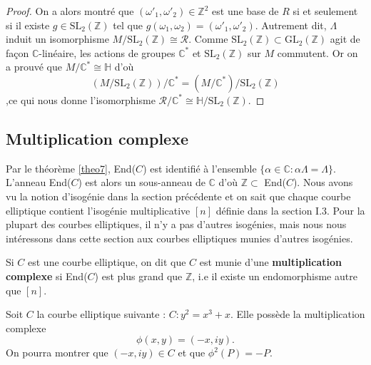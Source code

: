 \documentclass[a4paper]{article}
\begin{document}
\begin{proof}
On a alors montré que $(\omega'_{1},\omega'_{2}) \in \mathbb{Z}^2$ est une base de $R$ si et seulement si il existe $g \in \text{SL}_{2}(\mathbb{Z})$ tel que $g(\omega_{1},\omega_{2})=(\omega'_{1},\omega'_{2})$.
Autrement dit, $\Lambda$ induit un isomorphisme $M/\text{SL}_{2}(\mathbb{Z}) \cong \mathscr{R}$. 
 Comme $\text{SL}_{2}(\mathbb{Z}) \subset \text{GL}_{2}(\mathbb{Z})$ agit de façon $\mathbb{C}$-linéaire, les actions de groupes $\mathbb{C}^*$ et $\text{SL}_{2}(\mathbb{Z})$ sur $M$ commutent. Or on a prouvé que $M/\mathbb{C}^* \cong \mathbb{H}$ d'où 
 \begin{equation*}
 (M/\text{SL}_{2}(\mathbb{Z}))/\mathbb{C}^*=(M/\mathbb{C}^*)/\text{SL}_{2}(\mathbb{Z})
 \end{equation*}
,ce qui  nous donne l'isomorphisme $\mathscr{R}/\mathbb{C}^* \cong \mathbb{H} /\text{SL}_{2}(\mathbb{Z})$. 
\end{proof}




\subsection{Multiplication complexe}
\noindent Par le théorème \ref{theo7}, End($C$) est identifié à l'ensemble $\{\alpha \in \mathbb{C} : \alpha \Lambda=\Lambda\}$. L'anneau End($C$) est alors un sous-anneau de $\mathbb{C}$ d'où $\mathbb{Z} \subset$ End($C$).
Nous avons vu la notion d'isogénie dans la section précédente et on sait que chaque courbe elliptique contient l'isogénie multiplicative $[n]$ définie dans la section I.3. Pour la plupart des courbes elliptiques, il n'y a pas d'autres isogénies, mais nous nous intéressons dans cette section aux courbes elliptiques munies d'autres isogénies.


\begin{definition}
Si $C$ est une courbe elliptique, on dit que $C$ est munie d'une \textbf{multiplication complexe} si End($C$) est plus grand que $\mathbb{Z}$, i.e il existe un endomorphisme autre que $[n]$.
\end{definition}

\begin{ex}
\normalfont Soit $C$ la courbe elliptique suivante : $C :y^2=x^3+x$.
Elle possède la multiplication complexe
\begin{equation*}
\phi(x,y)=(-x,iy).
\end{equation*}
On pourra montrer que $(-x,iy) \in C$ et que $\phi^2(P)=-P$.
\end{ex}
\end{document}
